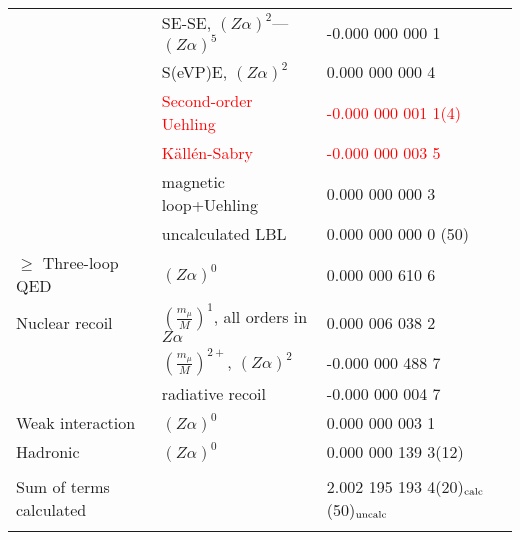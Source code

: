 \begin{table}
\begin{footnotesize}
\begin{tabular}{llll}
                        & SE-SE, $(Z \alpha)^2$--- $(Z \alpha)^5$ & -0.000 000 000 1& \cite{Eides1997,Czarnecki2000,Pachucki2005,czarnecki2018}\\
                        & S(eVP)E, $(Z \alpha)^2$                 & \phantom{-}0.000 000 000 4& \cite{Peterman57,Sommerfield58,Eides1997,Czarnecki2000}\\
                        & \textcolor{red}{Second-order Uehling}  & \textcolor{red}{-0.000 000 001 1(4)}             & \\
                        & \textcolor{red}{K\"all\'en-Sabry}      & \textcolor{red}{-0.000 000 003 5}                & \\
                        & magnetic loop+Uehling & \phantom{-}0.000 000 000 3      & \\
                        & uncalculated LBL      & \phantom{-}0.000 000 000 0 (50) & \\
$\ge$ Three-loop QED    & $(Z \alpha)^0$        & \phantom{-}0.000 000 610 6      & \cite{Laporta96,aoyama2007,Aoyama12,codata} \\
Nuclear recoil          & $\left(\frac{m_{\mu}}{M}\right)^1$, all orders in $Z \alpha$  & \phantom{-}0.000 006 038 2 &  \cite{Shabaev2002}\\
                        & $\left(\frac{m_{\mu}}{M}\right)^{2+}$, $(Z \alpha)^2$ & -0.000 000 488 7 &  \cite{Pachucki2008}\\
                        & radiative recoil      &  -0.000 000 004 7 & \cite{Grotch1970}\\
Weak interaction        & $(Z\alpha)^0$         &  \phantom{-}0.000 000 003 1     & \cite{Czarnecki96,codata} \\
Hadronic  &  $(Z\alpha)^0$        &  \phantom{-}0.000 000 139 3(12) & \cite{Prades10,Nomura13,Kurz14,codata} \\
\hline\\[-17pt]
Sum of terms calculated &     &  \multicolumn{2}{l}{\phantom{-}2.002 195 193 4(20)${}_{\rm calc}$(50)${}_{\rm uncalc}$}\\
\hline \\[-15pt] \hline
\end{tabular}
\end{footnotesize}
\end{table}
%
%